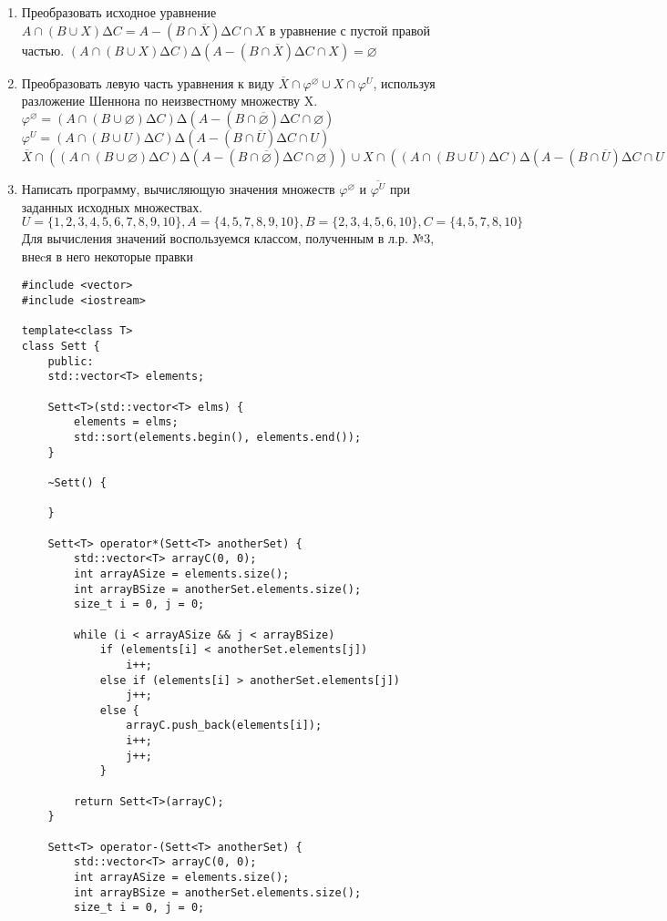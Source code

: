 \documentclass[a4paper,14pt]{extarticle}
\begin{document}
	\begin{enumerate}[№1. ]
		\item Преобразовать исходное уравнение $A\cap(B \cup X)∆C = A- (B\cap \overline{X})∆C \cap X$ в уравнение с пустой правой частью.\bigbreak
		$(A\cap(B \cup X)∆C) ∆ (A- (B\cap \overline{X})∆C \cap X) =\varnothing$
		\item Преобразовать левую часть уравнения к виду $\overline{X}\cap \varphi ^ \varnothing \cup X \cap \varphi ^ U$, используя разложение Шеннона по неизвестному множеству X.\bigbreak
		$\varphi ^ \varnothing = (A\cap(B \cup \varnothing)∆C) ∆ (A- (B\cap \overline{\varnothing})∆C \cap \varnothing)$\\
		$\varphi ^ U = (A\cap(B \cup U)∆C) ∆ (A- (B\cap \overline{U})∆C \cap U)$\\
		$\overline{X}\cap ((A\cap(B \cup \varnothing)∆C) ∆ (A- (B\cap \overline{\varnothing})∆C \cap \varnothing)) \cup X \cap ((A\cap(B \cup U)∆C) ∆ (A- (B\cap \overline{U})∆C \cap U)) = \varnothing$
		\item Написать программу, вычисляющую значения множеств $\varphi ^ \varnothing$ и $\overline{\varphi ^ U}$ при заданных исходных множествах. $U = \{1, 2, 3, 4, 5, 6, 7, 8, 9, 10\}, A = \{4, 5, 7, 8, 9, 10\}, B = \{2, 3, 4, 5, 6, 10\}, C = \{4, 5, 7, 8, 10\}$\bigbreak
		Для вычисления значений воспользуемся классом, полученным в л.р. №3, внеcя в него некоторые правки
\begin{verbatim}
#include <vector>
#include <iostream>

template<class T>
class Sett {
	public:
	std::vector<T> elements;
	
	Sett<T>(std::vector<T> elms) {
		elements = elms;
		std::sort(elements.begin(), elements.end());
	}
	
	~Sett() {
		
	}
	
	Sett<T> operator*(Sett<T> anotherSet) {
		std::vector<T> arrayC(0, 0);
		int arrayASize = elements.size();
		int arrayBSize = anotherSet.elements.size();
		size_t i = 0, j = 0;
		
		while (i < arrayASize && j < arrayBSize)
			if (elements[i] < anotherSet.elements[j])
				i++;
			else if (elements[i] > anotherSet.elements[j])
				j++;
			else {
				arrayC.push_back(elements[i]);
				i++;
				j++;
			}
		
		return Sett<T>(arrayC);
	}
	
	Sett<T> operator-(Sett<T> anotherSet) {
		std::vector<T> arrayC(0, 0);
		int arrayASize = elements.size();
		int arrayBSize = anotherSet.elements.size();
		size_t i = 0, j = 0;
		

\end{verbatim}
\end{enumerate}
\end{document}
